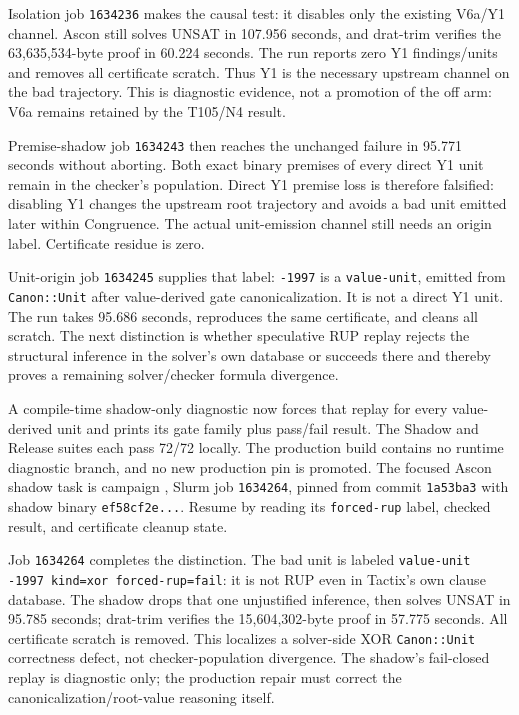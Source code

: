 \documentclass[11pt]{article}
\newcommand{\code}[1]{\texttt{#1}}
\newcommand{\artifact}[1]{\path{#1}}
\begin{document}
Isolation job \code{1634236} makes the causal test: it disables only the
existing V6a/Y1 channel. Ascon still solves UNSAT in 107.956 seconds, and
drat-trim verifies the 63,635,534-byte proof in 60.224 seconds. The run reports
zero Y1 findings/units and removes all certificate scratch. Thus Y1 is the
necessary upstream channel on the bad trajectory. This is diagnostic evidence,
not a promotion of the off arm: V6a remains retained by the T105/N4 result.

Premise-shadow job \code{1634243} then reaches the unchanged failure in 95.771
seconds without aborting. Both exact binary premises of every direct Y1 unit
remain in the checker's population. Direct Y1 premise loss is therefore
falsified: disabling Y1 changes the upstream root trajectory and avoids a bad
unit emitted later within Congruence. The actual unit-emission channel still
needs an origin label. Certificate residue is zero.

Unit-origin job \code{1634245} supplies that label: \code{-1997} is a
\code{value-unit}, emitted from \code{Canon::Unit} after value-derived gate
canonicalization. It is not a direct Y1 unit. The run takes 95.686 seconds,
reproduces the same certificate, and cleans all scratch. The next distinction
is whether speculative RUP replay rejects the structural inference in the
solver's own database or succeeds there and thereby proves a remaining
solver/checker formula divergence.

A compile-time shadow-only diagnostic now forces that replay for every
value-derived unit and prints its gate family plus pass/fail result. The Shadow
and Release suites each pass 72/72 locally. The production build contains no
runtime diagnostic branch, and no new production pin is promoted. The focused
Ascon shadow task is campaign
\artifact{20260818-2212-ascon-value-unit-replay}, Slurm job \code{1634264},
pinned from commit \code{1a53ba3} with shadow binary \code{ef58cf2e...}.
Resume by reading its \code{forced-rup} label, checked result, and certificate
cleanup state.

Job \code{1634264} completes the distinction. The bad unit is labeled
\code{value-unit -1997 kind=xor forced-rup=fail}: it is not RUP even in
Tactix's own clause database. The shadow drops that one unjustified inference,
then solves UNSAT in 95.785 seconds; drat-trim verifies the 15,604,302-byte
proof in 57.775 seconds. All certificate scratch is removed. This localizes a
solver-side XOR \code{Canon::Unit} correctness defect, not checker-population
divergence. The shadow's fail-closed replay is diagnostic only; the production
repair must correct the canonicalization/root-value reasoning itself.
\end{document}
